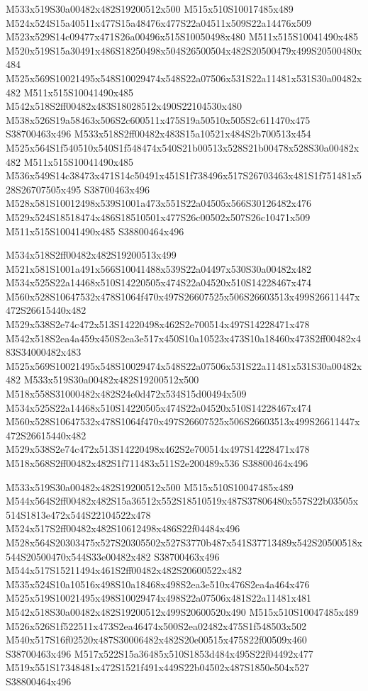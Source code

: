 \documentclass{article}
\begin{document}
\begin{multicols}{2}
M533x519S30a00482x482S19200512x500 M515x510S10017485x489 M524x524S15a40511x477S15a48476x477S22a04511x509S22a14476x509 M523x529S14c09477x471S26a00496x515S10050498x480 M511x515S10041490x485 M520x519S15a30491x486S18250498x504S26500504x482S20500479x499S20500480x484 M525x569S10021495x548S10029474x548S22a07506x531S22a11481x531S30a00482x482 M511x515S10041490x485 M542x518S2ff00482x483S18028512x490S22104530x480 M538x526S19a58463x506S2c600511x475S19a50510x505S2c611470x475 S38700463x496 M533x518S2ff00482x483S15a10521x484S2b700513x454 M525x564S1f540510x540S1f548474x540S21b00513x528S21b00478x528S30a00482x482 M511x515S10041490x485 M536x549S14c38473x471S14c50491x451S1f738496x517S26703463x481S1f751481x528S26707505x495 S38700463x496 M528x581S10012498x539S1001a473x551S22a04505x566S30126482x476 M529x524S18518474x486S18510501x477S26c00502x507S26c10471x509 M511x515S10041490x485 S38800464x496

M534x518S2ff00482x482S19200513x499 M521x581S1001a491x566S10041488x539S22a04497x530S30a00482x482 M534x525S22a14468x510S14220505x474S22a04520x510S14228467x474 M560x528S10647532x478S1064f470x497S26607525x506S26603513x499S26611447x472S26615440x482 M529x538S2e74c472x513S14220498x462S2e700514x497S14228471x478 M542x518S2ea4a459x450S2ea3e517x450S10a10523x473S10a18460x473S2ff00482x483S34000482x483 M525x569S10021495x548S10029474x548S22a07506x531S22a11481x531S30a00482x482 M533x519S30a00482x482S19200512x500 M518x558S31000482x482S24e0d472x534S15d00494x509 M534x525S22a14468x510S14220505x474S22a04520x510S14228467x474 M560x528S10647532x478S1064f470x497S26607525x506S26603513x499S26611447x472S26615440x482 M529x538S2e74c472x513S14220498x462S2e700514x497S14228471x478 M518x568S2ff00482x482S1f711483x511S2e200489x536 S38800464x496

M533x519S30a00482x482S19200512x500 M515x510S10047485x489 M544x564S2ff00482x482S15a36512x552S18510519x487S37806480x557S22b03505x514S1813e472x544S22104522x478 M524x517S2ff00482x482S10612498x486S22f04484x496 M528x564S20303475x527S20305502x527S3770b487x541S37713489x542S20500518x544S20500470x544S33e00482x482 S38700463x496 M544x517S15211494x461S2ff00482x482S20600522x482 M535x524S10a10516x498S10a18468x498S2ea3e510x476S2ea4a464x476 M525x519S10021495x498S10029474x498S22a07506x481S22a11481x481 M542x518S30a00482x482S19200512x499S20600520x490 M515x510S10047485x489 M526x526S1f522511x473S2ea46474x500S2ea02482x475S1f548503x502 M540x517S16f02520x487S30006482x482S20e00515x475S22f00509x460 S38700463x496 M517x522S15a36485x510S1853d484x495S22f04492x477 M519x551S17348481x472S1521f491x449S22b04502x487S1850e504x527 S38800464x496


\end{multicols}
\end{document}
